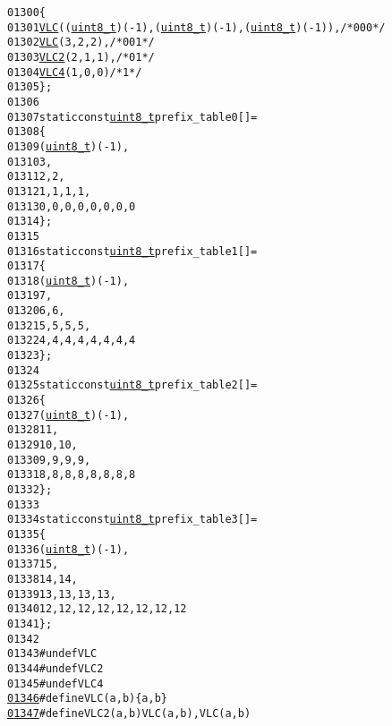 \begin{footnotesize}
\begin{alltt}
01300 \{
01301         \hyperlink{vlc_8h_a7f3572774a720fd9b4bc3b1a0b65082f}{VLC}((\hyperlink{_types_8h_a363e4d606232036a6b89060813c45489}{uint8_t})(-1), (\hyperlink{_types_8h_a363e4d606232036a6b89060813c45489}{uint8_t})(-1), (\hyperlink{_types_8h_a363e4d606232036a6b89060813c45489}{uint8_t})(-1)),   \textcolor{comment}{/* 000 */}
01302         \hyperlink{vlc_8h_a7f3572774a720fd9b4bc3b1a0b65082f}{VLC}(3, 2, 2),      \textcolor{comment}{/* 001 */}
01303         \hyperlink{vlc_8h_ad3cda36b9c6132357c7f7de5e52a6c93}{VLC2}(2, 1, 1),     \textcolor{comment}{/* 01 */}
01304         \hyperlink{vlc_8h_a02cdc921d8f03450b12879e8afb222cb}{VLC4}(1, 0, 0)      \textcolor{comment}{/* 1 */}
01305 \};
01306 
01307 \textcolor{keyword}{static} \textcolor{keyword}{const} \hyperlink{_types_8h_a363e4d606232036a6b89060813c45489}{uint8_t} prefix\_table0[] = 
01308 \{
01309         (\hyperlink{_types_8h_a363e4d606232036a6b89060813c45489}{uint8_t})(-1),
01310         3,
01311         2, 2,
01312         1, 1, 1, 1,
01313         0, 0, 0, 0, 0, 0, 0, 0
01314 \};
01315 
01316 \textcolor{keyword}{static} \textcolor{keyword}{const} \hyperlink{_types_8h_a363e4d606232036a6b89060813c45489}{uint8_t} prefix\_table1[] = 
01317 \{
01318         (\hyperlink{_types_8h_a363e4d606232036a6b89060813c45489}{uint8_t})(-1),
01319         7,
01320         6, 6,
01321         5, 5, 5, 5,
01322         4, 4, 4, 4, 4, 4, 4, 4
01323 \};
01324 
01325 \textcolor{keyword}{static} \textcolor{keyword}{const} \hyperlink{_types_8h_a363e4d606232036a6b89060813c45489}{uint8_t} prefix\_table2[] =
01326 \{
01327         (\hyperlink{_types_8h_a363e4d606232036a6b89060813c45489}{uint8_t})(-1),
01328         11,
01329         10, 10,
01330         9, 9, 9, 9,
01331         8, 8, 8, 8, 8, 8, 8, 8
01332 \};
01333 
01334 \textcolor{keyword}{static} \textcolor{keyword}{const} \hyperlink{_types_8h_a363e4d606232036a6b89060813c45489}{uint8_t} prefix\_table3[] = 
01335 \{
01336         (\hyperlink{_types_8h_a363e4d606232036a6b89060813c45489}{uint8_t})(-1),
01337         15,
01338         14, 14,
01339         13, 13, 13, 13,
01340         12, 12, 12, 12, 12, 12, 12, 12
01341 \};
01342 
01343 \textcolor{preprocessor}{#undef VLC}
01344 \textcolor{preprocessor}{}\textcolor{preprocessor}{#undef VLC2}
01345 \textcolor{preprocessor}{}\textcolor{preprocessor}{#undef VLC4}
\hypertarget{vlc_8h_source_l01346}{}\hyperlink{vlc_8h_abcb3e8dd3767b4229f15f1fb1f2bd263}{01346} \textcolor{preprocessor}{}\textcolor{preprocessor}{#define VLC(a, b) \{a, b\}}
\hypertarget{vlc_8h_source_l01347}{}\hyperlink{vlc_8h_a9b868c0aefbcae8a49f5148c3bcf6fed}{01347} \textcolor{preprocessor}{}\textcolor{preprocessor}{#define VLC2(a, b) VLC(a, b), VLC(a, b)}

\end{alltt}
\end{footnotesize}
